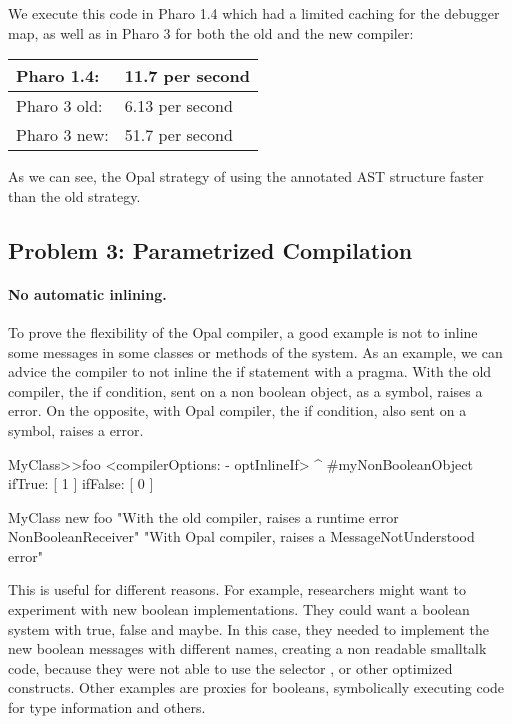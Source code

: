 \documentclass[preprint,10pt]{sigplanconf}
\begin{document}
We execute this code in Pharo 1.4 which had a limited caching for the debugger map, as well as in Pharo 3 for both the old and the new compiler:
\vspace{0.2cm}

\begin{center}
\begin{tabular}{|l|l|}
  \hline
Pharo 1.4: &11.7 per second \\
\hline
Pharo 3 old: & 6.13 per second \\
\hline
Pharo 3 new: & 51.7 per second \\
  \hline
\end{tabular}
\end{center}

As we can see, the Opal strategy of using the annotated AST structure faster than the old strategy.

\subsection{Problem 3: Parametrized Compilation}

\paragraph{No automatic inlining.}
To prove the flexibility of the Opal compiler, a good example is not to inline some messages in some classes or methods of the system. As an example, we can advice the compiler to not inline the if statement with a pragma. With the old compiler, the if condition, sent on a non boolean object, as a symbol, raises a  error. On the opposite, with Opal compiler, the if condition, also sent on a symbol, raises a  error.

\begin{code}{}
MyClass>>foo
        <compilerOptions: - optInlineIf>
        ^ #myNonBooleanObject ifTrue: [ 1 ] ifFalse: [ 0 ]
        
MyClass new foo 
"With the old compiler, raises a runtime error NonBooleanReceiver"
"With Opal compiler, raises a MessageNotUnderstood error"
\end{code}

This is useful for different reasons. For example, researchers might want to experiment with new boolean implementations. They could want a boolean system with true, false and maybe. In this case, they needed to implement the new boolean messages with different names, creating a non readable smalltalk code, because they were not able to use the selector ,  or other optimized constructs. Other examples are proxies for booleans, symbolically executing code for type information and others.
\end{document}
